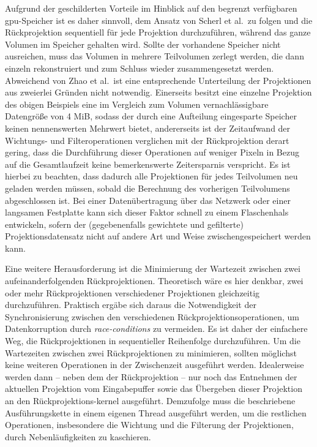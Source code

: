 Aufgrund der geschilderten Vorteile im Hinblick auf den begrenzt verfügbaren \gls{gpu}-Speicher ist es daher sinnvoll,
dem Ansatz von Scherl et al.\ zu folgen und die Rückprojektion sequentiell für jede Projektion durchzuführen, während
das ganze Volumen im Speicher gehalten wird. Sollte der vorhandene Speicher nicht ausreichen, muss das Volumen
in mehrere Teilvolumen zerlegt werden, die dann einzeln rekonstruiert und zum Schluss wieder zusammengesetzt werden.
Abweichend von Zhao et al.\ ist eine entsprechende Unterteilung der Projektionen aus zweierlei Gründen nicht notwendig.
Einerseits besitzt eine einzelne Projektion des obigen Beispiels eine im Vergleich zum Volumen vernachlässigbare
Datengröße von 4 MiB, sodass der durch eine Aufteilung eingesparte Speicher keinen nennenswerten Mehrwert bietet,
andererseits ist der Zeitaufwand der Wichtungs- und Filteroperationen verglichen mit der Rückprojektion derart gering,
dass die Durchführung dieser Operationen auf weniger Pixeln in Bezug auf die Gesamtlaufzeit keine bemerkenswerte
Zeitersparnis verspricht. Es ist hierbei zu beachten, dass dadurch alle Projektionen für jedes Teilvolumen neu geladen
werden müssen, sobald die Berechnung des vorherigen Teilvolumens abgeschlossen ist. Bei einer Datenübertragung über das
Netzwerk oder einer langsamen Festplatte kann sich dieser Faktor schnell zu einem Flaschenhals entwickeln, sofern der
(gegebenenfalls gewichtete und gefilterte) Projektionsdatensatz nicht auf andere Art und Weise zwischengespeichert
werden kann.

Eine weitere Herausforderung ist die Minimierung der Wartezeit zwischen zwei aufeinanderfolgenden Rückprojektionen.
Theoretisch wäre es hier denkbar, zwei oder mehr Rückprojektionen verschiedener Projektionen gleichzeitig durchzuführen.
Praktisch ergäbe sich daraus die Notwendigkeit der Synchronisierung zwischen den verschiedenen
Rückprojektionsoperationen, um Datenkorruption durch \textit{\glspl{race-condition}} zu vermeiden. Es ist daher der
einfachere Weg, die Rückprojektionen in sequentieller Reihenfolge durchzuführen. Um die Wartezeiten zwischen zwei
Rückprojektionen zu minimieren, sollten möglichst keine weiteren Operationen in der Zwischenzeit ausgeführt werden.
Idealerweise werden dann -- neben dem der Rückprojektion -- nur noch das Entnehmen der aktuellen Projektion vom
Eingabepuffer sowie das Übergeben dieser Projektion an den Rückprojektions-\gls{kernel} ausgeführt. Demzufolge muss die
beschriebene Ausführungskette in einem eigenen Thread ausgeführt werden, um die restlichen Operationen, insbesondere die
Wichtung und die Filterung der Projektionen, durch Nebenläufigkeiten zu kaschieren.

